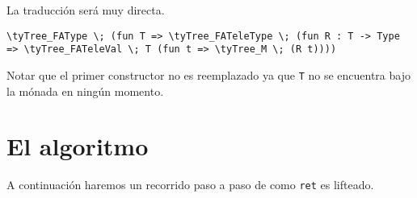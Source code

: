 La traducción será muy directa.

\begin{lstlisting}
\tyTree_FAType \; (fun T => \tyTree_FATeleType \; (fun R : T -> Type => \tyTree_FATeleVal \; T (fun t => \tyTree_M \; (R t))))
\end{lstlisting}

Notar que el primer constructor no es reemplazado ya que \lstinline{T} no se encuentra bajo la mónada en ningún momento.

\section{El algoritmo}

A continuación haremos un recorrido paso a paso de como \lstinline{ret} es lifteado.

